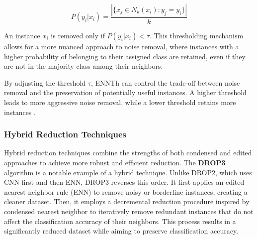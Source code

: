 \begin{equation}
P(y_i | x_i) = \frac{|\{x_j \in N_k(x_i) : y_j = y_i\}|}{k}
\end{equation}

An instance $x_i$ is removed only if $P(y_i | x_i) < \tau$. This thresholding mechanism allows for a more nuanced approach to noise removal, where instances with a higher probability of belonging to their assigned class are retained, even if they are not in the majority class among their neighbors.

By adjusting the threshold $\tau$, ENNTh can control the trade-off between noise removal and the preservation 
of potentially useful instances. A higher threshold leads to more aggressive noise removal, while a lower threshold 
retains more instances \cite{ENNTH}.



\subsubsection*{Hybrid Reduction Techniques}

Hybrid reduction techniques combine the strengths of both condensed and edited approaches to 
achieve more robust and efficient reduction. The \textbf{DROP3} algorithm \cite{Wilson2000} 
is a notable example of a hybrid technique. Unlike DROP2, which uses CNN first and then ENN, DROP3 reverses this order. 
It first applies an edited nearest neighbor rule (ENN) to remove noisy or borderline instances, creating a cleaner dataset.
Then, it employs a decremental reduction procedure inspired by condensed nearest neighbor to iteratively remove redundant
instances that do not affect the classification accuracy of their neighbors. This process results in a significantly 
reduced dataset while aiming to preserve classification accuracy.

